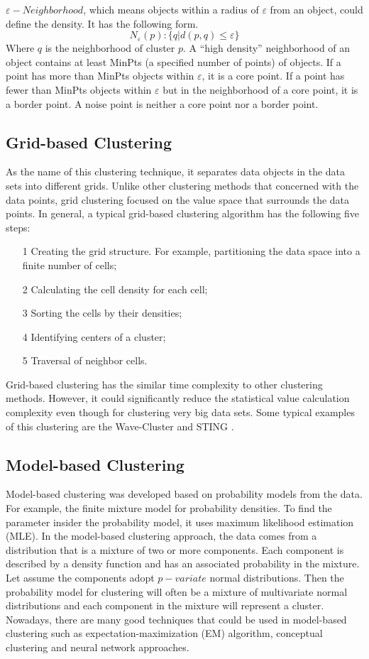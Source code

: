 \documentclass[sigconf]{acmart}
\begin{document}
$\varepsilon-Neighborhood$, which means objects within a radius of $\varepsilon$ from an object, could define the density. It has the following form.
\[N_{\varepsilon}(p):\{q \vert d(p,q)\leq \varepsilon\}\]
Where $q$ is the neighborhood of cluster $p$. A ``high density'' neighborhood of an object contains at least MinPts (a specified number of points) of objects. If a point has more than MinPts objects within $\varepsilon$, it is a core point. If a point has fewer than MinPts objects within $\varepsilon$ but in the neighborhood of a core point, it is a border point. A noise point is neither a core point nor a border point.

\subsection{Grid-based Clustering}

As the name of this clustering technique, it separates data objects in the data sets into different grids. Unlike other clustering methods that concerned with the data points, grid clustering focused on the value space that surrounds the data points. In general, a typical grid-based clustering algorithm has the following five steps:
\begin{itemize}
\item[1] Creating the grid structure. For example, partitioning the data space into a finite number of cells;
\item[2] Calculating the cell density for each cell;
\item[3] Sorting the cells by their densities;
\item[4] Identifying centers of a cluster;
\item[5] Traversal of neighbor cells.
\end{itemize}

Grid-based clustering has the similar time complexity to other clustering methods. However, it could significantly reduce the statistical value calculation complexity even though for clustering very big data sets. Some typical examples of this clustering are the Wave-Cluster and STING \cite{dcar}.

\subsection{Model-based Clustering}

Model-based clustering was developed based on probability models from the data. For example, the finite mixture model for probability densities. To find the parameter insider the probability model, it uses maximum likelihood estimation (MLE). In the model-based clustering approach, the data comes from a distribution that is a mixture of two or more components. Each component is described by a density function and has an associated probability in the mixture. Let assume the components adopt $p-variate$ normal distributions. Then the probability model for clustering will often be a mixture of multivariate normal distributions and each component in the mixture will represent a cluster. Nowadays, there are many good techniques that could be used in model-based clustering such as expectation-maximization (EM) algorithm, conceptual clustering and neural network approaches.
\end{document}

